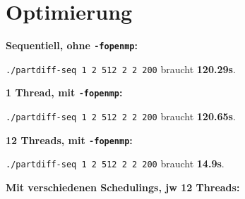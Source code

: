 \section{Optimierung}\label{optimierung}

\textbf{Sequentiell, ohne \texttt{-fopenmp}:}

\texttt{./partdiff-seq 1 2 512 2 2 200} braucht \textbf{120.29s}.

\textbf{1 Thread, mit \texttt{-fopenmp}:}

\texttt{./partdiff-seq 1 2 512 2 2 200} braucht \textbf{120.65s}.

\textbf{12 Threads, mit \texttt{-fopenmp}:}

\texttt{./partdiff-seq 1 2 512 2 2 200} braucht \textbf{14.9s}.

\textbf{Mit verschiedenen Schedulings, jw 12 Threads:}


